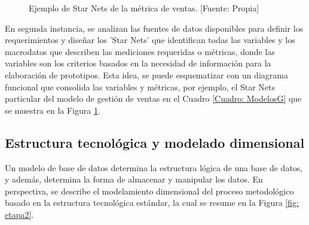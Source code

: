 \documentclass[11pt,titlepage]{report}
\begin{document}
\begin{figure}
\caption{Ejemplo de Star Nets de la métrica de ventas. [Fuente: Propia]}
\label{fig: starnet}
\end{figure}

En segunda instancia, se analizan las fuentes de datos disponibles para definir los requerimientos y diseñar los 'Star Nets' que identifican todas las variables y los macrodatos que describen las mediciones requeridas o métricas, donde las variables son los criterios basados en la necesidad de información para la elaboración de prototipos. Esta idea, se puede esquematizar con un diagrama funcional que consolida las variables y métricas, por ejemplo, el Star Nets particular del modelo de gestión de ventas en el Cuadro \ref{Cuadro: ModelosG} que se muestra en la Figura \ref{fig: starnet}.



\subsection{Estructura tecnológica y modelado dimensional} 
Un modelo de base de datos determina la estructura lógica de una base de datos, y además, determina la forma de almacenar y manipular los datos. En perspectiva, se describe el modelamiento dimensional del proceso metodológico basado en la estructura tecnológica estándar, la cual se resume en la Figura \ref{fig: etapa2}.
\end{document}
